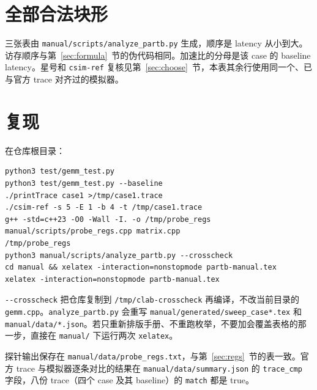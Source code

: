 \documentclass[11pt,a4paper,fontset=fandol]{ctexart}
\newcommand{\code}[1]{\texttt{#1}}
\begin{document}


\appendix
\section{全部合法块形}
\label{sec:sweep}

三张表由 \code{manual/scripts/analyze\_partb.py} 生成，顺序是 latency 从小到大。访存顺序与第~\ref{sec:formula}~节的伪代码相同。加速比的分母是该 case 的 baseline latency。星号和 \code{csim-ref} 复核见第~\ref{sec:choose}~节，本表其余行使用同一个、已与官方 trace 对齐过的模拟器。

\begingroup
\footnotesize
\setlength{\tabcolsep}{3pt}
\setlength{\LTcapwidth}{\textwidth}
\setlength{\LTleft}{0pt plus 1fill}
\setlength{\LTright}{0pt plus 1fill}



\endgroup

\section{复现}
\label{sec:repro}

在仓库根目录：

\begin{lstlisting}
python3 test/gemm_test.py
python3 test/gemm_test.py --baseline
./printTrace case1 >/tmp/case1.trace
./csim-ref -s 5 -E 1 -b 4 -t /tmp/case1.trace
g++ -std=c++23 -O0 -Wall -I. -o /tmp/probe_regs manual/scripts/probe_regs.cpp matrix.cpp
/tmp/probe_regs
python3 manual/scripts/analyze_partb.py --crosscheck
cd manual && xelatex -interaction=nonstopmode partb-manual.tex
xelatex -interaction=nonstopmode partb-manual.tex
\end{lstlisting}

\code{-{}-crosscheck} 把仓库复制到 \code{/tmp/clab-crosscheck} 再编译，不改当前目录的 \code{gemm.cpp}。\code{analyze\_partb.py} 会重写 \code{manual/generated/sweep\_case*.tex} 和 \code{manual/data/*.json}。若只重新排版手册、不重跑枚举，不要加会覆盖表格的那一步，直接在 \code{manual/} 下运行两次 \code{xelatex}。

探针输出保存在 \code{manual/data/probe\_regs.txt}，与第~\ref{sec:regs}~节的表一致。官方 trace 与模拟器逐条对比的结果在 \code{manual/data/summary.json} 的 \code{trace\_cmp} 字段，八份 trace（四个 case 及其 baseline）的 \code{match} 都是 true。
\end{document}
